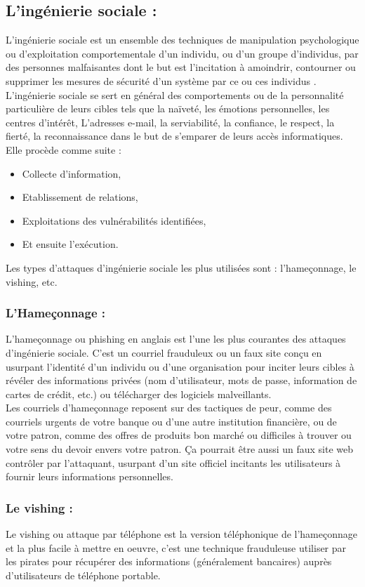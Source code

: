 \subsection{L'ingénierie sociale : }
L’ingénierie sociale est un ensemble des techniques de manipulation psychologique ou d’exploitation comportementale d’un individu, ou d’un groupe d’individus, par des personnes malfaisantes dont le but est l’incitation à amoindrir, contourner ou supprimer les mesures de sécurité d’un système par ce ou ces individus \cite{ref13}.\\
L’ingénierie sociale se sert en général des comportements ou de la personnalité particulière de leurs cibles tels que la naïveté, les émotions personnelles, les centres d’intérêt, L’adresses e-mail, la serviabilité, la confiance, le respect, la fierté, la reconnaissance dans le but de s’emparer de leurs accès informatiques. Elle procède comme suite : 
\begin{itemize}
	\item Collecte d’information,
	\item Etablissement de relations,
	\item Exploitations des vulnérabilités identifiées,
	\item Et ensuite l’exécution.
\end{itemize}
Les types d’attaques d’ingénierie sociale les plus utilisées sont : l’hameçonnage, le vishing, etc.
\subsubsection{L’Hameçonnage : }
L’hameçonnage ou phishing en anglais est l’une les plus courantes des attaques d’ingénierie sociale. C’est un courriel frauduleux ou un faux site conçu en usurpant l’identité d’un individu ou d’une organisation pour inciter leurs cibles à révéler des informations privées (nom d’utilisateur, mots de passe, information de cartes de crédit, etc.) ou télécharger des logiciels malveillants.\\

Les courriels d'hameçonnage reposent sur des tactiques de peur, comme des courriels urgents de votre banque ou d'une autre institution financière, ou de votre patron, comme des offres de produits bon marché ou difficiles à trouver ou votre sens du devoir envers votre patron. Ça pourrait être aussi un faux site web contrôler par l’attaquant, usurpant d’un site officiel incitants les utilisateurs à fournir leurs informations personnelles.
\subsubsection{Le vishing : }
Le vishing ou attaque par téléphone est la version téléphonique de l’hameçonnage et la plus facile à mettre en oeuvre, c’est une technique frauduleuse utiliser par les pirates pour récupérer des informations (généralement bancaires) auprès d’utilisateurs de téléphone portable.\\

